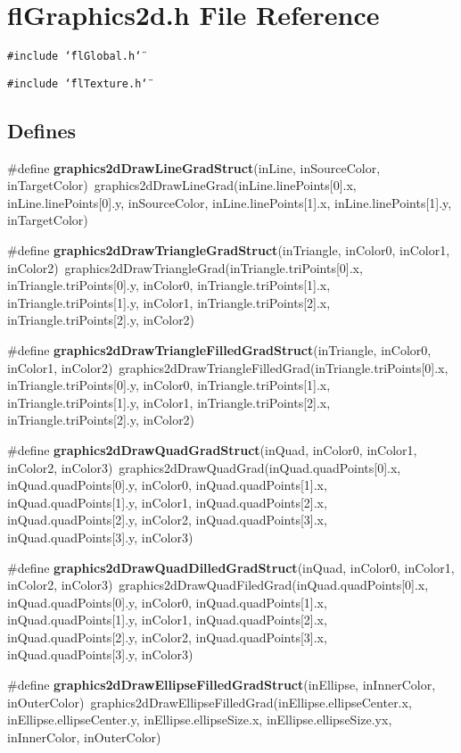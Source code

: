 \section{fl\-Graphics2d.h File Reference}
\label{flGraphics2d_8h}
{\tt \#include \char`\"{}fl\-Global.h\char`\"{}}\par
{\tt \#include \char`\"{}fl\-Texture.h\char`\"{}}\par
\subsection*{Defines}
\begin{CompactItemize}
\item 
\#define {\bf graphics2d\-Draw\-Line\-Grad\-Struct}(in\-Line, in\-Source\-Color, in\-Target\-Color)~graphics2d\-Draw\-Line\-Grad(in\-Line.line\-Points[0].x, in\-Line.line\-Points[0].y, in\-Source\-Color, in\-Line.line\-Points[1].x, in\-Line.line\-Points[1].y, in\-Target\-Color)
\item 
\#define {\bf graphics2d\-Draw\-Triangle\-Grad\-Struct}(in\-Triangle, in\-Color0, in\-Color1, in\-Color2)~graphics2d\-Draw\-Triangle\-Grad(in\-Triangle.tri\-Points[0].x, in\-Triangle.tri\-Points[0].y, in\-Color0, in\-Triangle.tri\-Points[1].x, in\-Triangle.tri\-Points[1].y, in\-Color1, in\-Triangle.tri\-Points[2].x, in\-Triangle.tri\-Points[2].y, in\-Color2)
\item 
\#define {\bf graphics2d\-Draw\-Triangle\-Filled\-Grad\-Struct}(in\-Triangle, in\-Color0, in\-Color1, in\-Color2)~graphics2d\-Draw\-Triangle\-Filled\-Grad(in\-Triangle.tri\-Points[0].x, in\-Triangle.tri\-Points[0].y, in\-Color0, in\-Triangle.tri\-Points[1].x, in\-Triangle.tri\-Points[1].y, in\-Color1, in\-Triangle.tri\-Points[2].x, in\-Triangle.tri\-Points[2].y, in\-Color2)
\item 
\#define {\bf graphics2d\-Draw\-Quad\-Grad\-Struct}(in\-Quad, in\-Color0, in\-Color1, in\-Color2, in\-Color3)~graphics2d\-Draw\-Quad\-Grad(in\-Quad.quad\-Points[0].x, in\-Quad.quad\-Points[0].y, in\-Color0, in\-Quad.quad\-Points[1].x, in\-Quad.quad\-Points[1].y, in\-Color1, in\-Quad.quad\-Points[2].x, in\-Quad.quad\-Points[2].y, in\-Color2, in\-Quad.quad\-Points[3].x, in\-Quad.quad\-Points[3].y, in\-Color3)
\item 
\#define {\bf graphics2d\-Draw\-Quad\-Dilled\-Grad\-Struct}(in\-Quad, in\-Color0, in\-Color1, in\-Color2, in\-Color3)~graphics2d\-Draw\-Quad\-Filed\-Grad(in\-Quad.quad\-Points[0].x, in\-Quad.quad\-Points[0].y, in\-Color0, in\-Quad.quad\-Points[1].x, in\-Quad.quad\-Points[1].y, in\-Color1, in\-Quad.quad\-Points[2].x, in\-Quad.quad\-Points[2].y, in\-Color2, in\-Quad.quad\-Points[3].x, in\-Quad.quad\-Points[3].y, in\-Color3)
\item 
\#define {\bf graphics2d\-Draw\-Ellipse\-Filled\-Grad\-Struct}(in\-Ellipse, in\-Inner\-Color, in\-Outer\-Color)~graphics2d\-Draw\-Ellipse\-Filled\-Grad(in\-Ellipse.ellipse\-Center.x, in\-Ellipse.ellipse\-Center.y, in\-Ellipse.ellipse\-Size.x, in\-Ellipse.ellipse\-Size.yx, in\-Inner\-Color, in\-Outer\-Color)
\end{CompactItemize}
